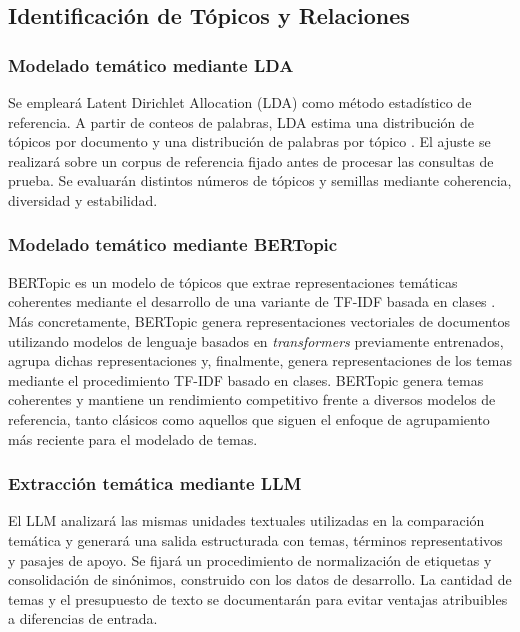 \documentclass[conference]{IEEEtran}
\begin{document}


\subsection{Identificación de Tópicos y Relaciones}
\label{subsec:relaciones}

\subsubsection{Modelado temático mediante LDA}

Se empleará Latent Dirichlet Allocation (LDA) como método estadístico de referencia. A partir de conteos de palabras, LDA estima una distribución de tópicos por documento y una distribución de palabras por tópico \cite{blei2003}. El ajuste se realizará sobre un corpus de referencia fijado antes de procesar las consultas de prueba. Se evaluarán distintos números de tópicos y semillas mediante coherencia, diversidad y estabilidad. 


\subsubsection{Modelado temático mediante BERTopic}

BERTopic es un modelo de tópicos que extrae representaciones temáticas coherentes mediante el desarrollo de una variante de TF-IDF basada en clases \cite{bertopic}. Más concretamente, BERTopic genera representaciones vectoriales de documentos utilizando modelos de lenguaje basados en \textit{transformers} previamente entrenados, agrupa dichas representaciones y, finalmente, genera representaciones de los temas mediante el procedimiento TF-IDF basado en clases. BERTopic genera temas coherentes y mantiene un rendimiento competitivo frente a diversos modelos de referencia, tanto clásicos como aquellos que siguen el enfoque de agrupamiento más reciente para el modelado de temas.

\subsubsection{Extracción temática mediante LLM}

El LLM analizará las mismas unidades textuales utilizadas en la comparación temática y generará una salida estructurada con temas, términos representativos y pasajes de apoyo. Se fijará un procedimiento de normalización de etiquetas y consolidación de sinónimos, construido con los datos de desarrollo. La cantidad de temas y el presupuesto de texto se documentarán para evitar ventajas atribuibles a diferencias de entrada.
\end{document}
